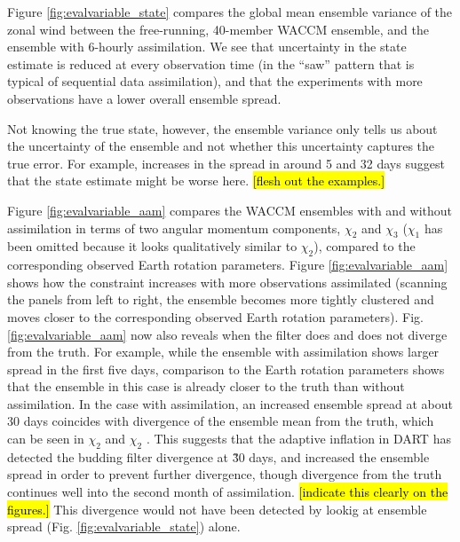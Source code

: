 Figure \ref{fig:evalvariable_state} compares the global mean ensemble variance of the zonal wind between the free-running, 40-member WACCM ensemble, and the ensemble with 6-hourly assimilation. 
We see that uncertainty in the state estimate is reduced at every observation time (in the ``saw'' pattern that is typical of sequential data assimilation), and that the experiments with more observations have a lower overall ensemble spread. 

Not knowing the true state, however, the ensemble variance only tells us about the uncertainty of the ensemble and not whether this uncertainty captures the true error. 
For example, 
increases in the spread in around 5 and 32 days suggest that the state estimate might be worse here.
\hl{[flesh out the examples.]}

Figure \ref{fig:evalvariable_aam} compares the WACCM ensembles with and without assimilation in terms of two angular momentum components, $\chi_2$ and $\chi_3$ ($\chi_1$ has been omitted because it looks qualitatively similar to $\chi_2$),  
compared to the corresponding observed Earth rotation parameters. 
Figure  \ref{fig:evalvariable_aam} shows how the constraint increases with more observations assimilated (scanning the panels from left to right, the ensemble becomes more tightly clustered and moves closer to the corresponding observed Earth rotation parameters). 
Fig. \ref{fig:evalvariable_aam} now also reveals when the filter does and does not diverge from the truth.  
For example, while the ensemble with assimilation shows larger spread in the first five days, comparison to the Earth rotation parameters shows that the ensemble in this case is already closer to the truth than without assimilation. 
In the case with assimilation, an increased ensemble spread at about 30 days coincides with divergence of the ensemble mean from the truth, which can be seen in $\chi_2$ and $\chi_2$ . 
This suggests that the adaptive inflation in DART has detected the budding filter divergence at \~30 days, and increased the ensemble spread in order to prevent further divergence, though divergence from the truth continues well into the second month of assimilation.
\hl{[indicate this clearly on the figures.]}
This divergence would not have been detected by lookig at ensemble spread (Fig. \ref{fig:evalvariable_state}) alone. 

